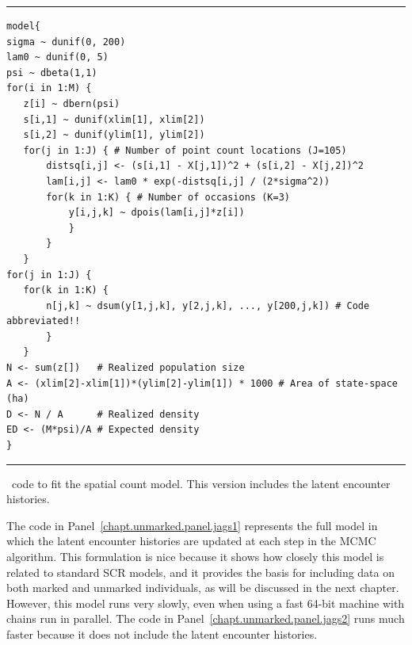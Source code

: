 \begin{panel}
\centering
\rule[0.05in]{\textwidth}{.03in}
\begin{small}
\begin{verbatim}
model{
sigma ~ dunif(0, 200)
lam0 ~ dunif(0, 5)
psi ~ dbeta(1,1)
for(i in 1:M) {
   z[i] ~ dbern(psi)
   s[i,1] ~ dunif(xlim[1], xlim[2])
   s[i,2] ~ dunif(ylim[1], ylim[2])
   for(j in 1:J) { # Number of point count locations (J=105)
       distsq[i,j] <- (s[i,1] - X[j,1])^2 + (s[i,2] - X[j,2])^2
       lam[i,j] <- lam0 * exp(-distsq[i,j] / (2*sigma^2))
       for(k in 1:K) { # Number of occasions (K=3)
           y[i,j,k] ~ dpois(lam[i,j]*z[i])
           }
       }
   }
for(j in 1:J) {
   for(k in 1:K) {
       n[j,k] ~ dsum(y[1,j,k], y[2,j,k], ..., y[200,j,k]) # Code abbreviated!!
       }
   }
N <- sum(z[])   # Realized population size
A <- (xlim[2]-xlim[1])*(ylim[2]-ylim[1]) * 1000 # Area of state-space (ha)
D <- N / A      # Realized density
ED <- (M*psi)/A # Expected density
}

\end{verbatim}
\end{small}
\rule[0.15in]{\textwidth}{.03in}
\caption{\jags~code to fit the spatial count model. This version
  includes the latent encounter histories.}
\label{chapt.unmarked.panel.jags1}
\end{panel}

The code in Panel~\ref{chapt.unmarked.panel.jags1} represents the full
model in which the latent encounter histories are updated at each step
in the MCMC algorithm. This formulation is nice because it shows how
closely this model is related to standard SCR models, and it provides
the basis for including data on both marked and unmarked individuals,
as will be discussed in the next chapter. However, this model runs
very slowly, even when using a fast 64-bit machine with chains run in parallel. The code
in Panel~\ref{chapt.unmarked.panel.jags2} runs much faster because it
does not include the latent encounter histories.


